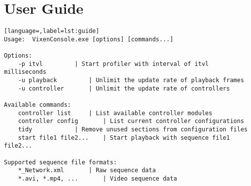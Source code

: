 \chapter{User Guide}
\renewcommand{\baselinestretch}{\mystretch}
\label{chap:Guide}


\begin{lstlisting}[language=,label=lst:guide]
Usage:  VixenConsole.exe [options] [commands...]

Options:
    -p itvl			| Start profiler with interval of itvl milliseconds
    -u playback			| Unlimit the update rate of playback frames
    -u controller		| Unlimit the update rate of controllers

Available commands:
    controller list		| List available controller modules
    controller config		| List current controller configurations
    tidy			| Remove unused sections from configuration files
    start file1 file2...	| Start playback with sequence file1 file2...

Supported sequence file formats:
    *_Network.xml		| Raw sequence data
    *.avi, *.mp4, ...		| Video sequence data
\end{lstlisting}

